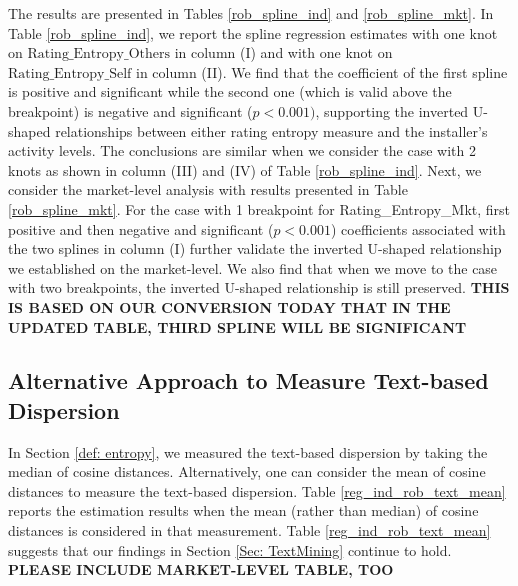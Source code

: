 \documentclass[msom,blindrev]{informs3}
\begin{document}
The results are presented in Tables \ref{rob_spline_ind} and \ref{rob_spline_mkt}. In Table \ref{rob_spline_ind}, we report the spline regression estimates with one knot on $\text{Rating\_Entropy\_Others}$ in column (I) and with one knot on $\text{Rating\_Entropy\_Self}$ in column (II). We find that the coefficient of the first spline is positive and significant while the second one (which is valid above the breakpoint) is negative and significant ($p<0.001)$, supporting the inverted U-shaped relationships between either rating entropy measure and the installer's activity levels. The conclusions are similar when we consider the case with 2 knots as shown in column (III) and (IV) of Table \ref{rob_spline_ind}.  Next, we consider the market-level analysis with results presented in Table \ref{rob_spline_mkt}. For the case with 1 breakpoint for Rating\_Entropy\_Mkt, first positive and then negative and significant ($p<0.001$) coefficients associated with the two splines in column (I) further validate the inverted U-shaped relationship we established on the market-level. We also find that when we move to the case with two breakpoints, the inverted U-shaped relationship is still preserved. \textbf{THIS IS BASED ON OUR CONVERSION TODAY THAT IN THE UPDATED TABLE, THIRD SPLINE WILL BE SIGNIFICANT}


%
%

\subsection{Alternative Approach to Measure Text-based Dispersion}

In Section \ref{def: entropy}, we measured the text-based dispersion by taking the median of cosine distances. Alternatively, one can consider the mean of cosine distances to measure the text-based dispersion. Table \ref{reg_ind_rob_text_mean} reports the estimation results when the mean (rather than median) of cosine distances is considered in that measurement. Table \ref{reg_ind_rob_text_mean} suggests that our findings in Section \ref{Sec: TextMining} continue to hold. \textbf{PLEASE INCLUDE MARKET-LEVEL TABLE, TOO}
\end{document}

